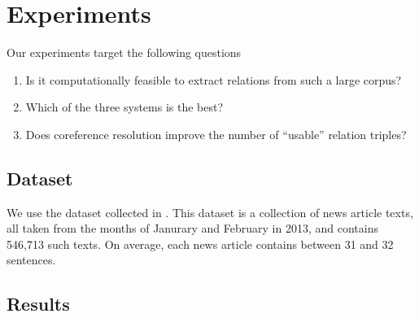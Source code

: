 \section{Experiments}

Our experiments target the following questions
\begin{enumerate}
\item Is it computationally feasible to extract relations from 
  such a large corpus?
\item Which of the three systems is the best?
\item Does coreference resolution improve the number of 
  ``usable'' relation triples?
\end{enumerate}

\subsection{Dataset}
We use the \newsspike{} dataset collected in \citet{zhang2013parallelparaphrase}.
This dataset is a collection of news article texts, all taken from the months of
Janurary and February in 2013, and contains 546,713 such texts. On average,
each news article contains between 31 and 32 sentences.

\subsection{Results}



 





